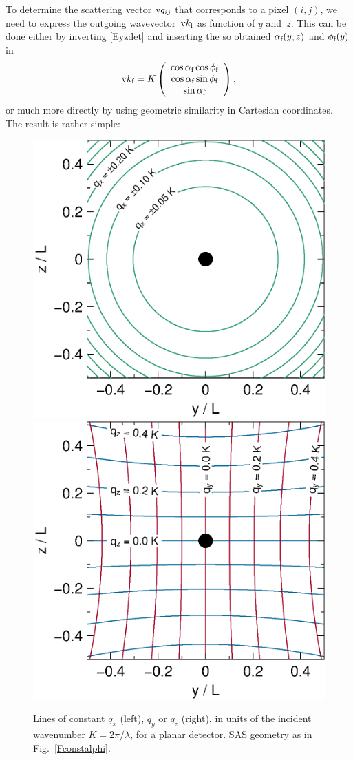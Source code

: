 To determine the scattering vector $\q_{ij}$
that corresponds to a pixel $(i,j)$,
we need to express the outgoing wavevector~$\k_\sf$ as function of $y$ and~$z$.
This can be done either by inverting \cref{Eyzdet}
and inserting the so obtained $\alpha_\sf(y,z)$ and $\phi_\sf(y)$ in
\begin{equation}\label{Ekf_by_angle}
  \k_\sf=K\left(\begin{array}{c}
   \cos\alpha_\sf\cos\phi_\sf\\
   \cos\alpha_\sf\sin\phi_\sf\\
   \sin\alpha_\sf\end{array}\right),
\end{equation}
or much more directly by using geometric similarity in Cartesian coordinates.
The result is rather simple:


\begin{figure}[t]
\begin{center}
\includegraphics[width=.47\textwidth]{fig/drawing/SAS_const_q_x.ps}
\hfill
\includegraphics[width=.47\textwidth]{fig/drawing/SAS_const_q_yz.ps}
\end{center}
\caption{Lines of constant $q_x$ (left), $q_y$ or $q_z$ (right),
in units of the incident wavenumber $K=2\pi/\lambda$,
for a planar detector.
SAS geometry as in Fig.~\protect\ref{Fconstalphi}.}
\label{Fconstq}
\end{figure}

